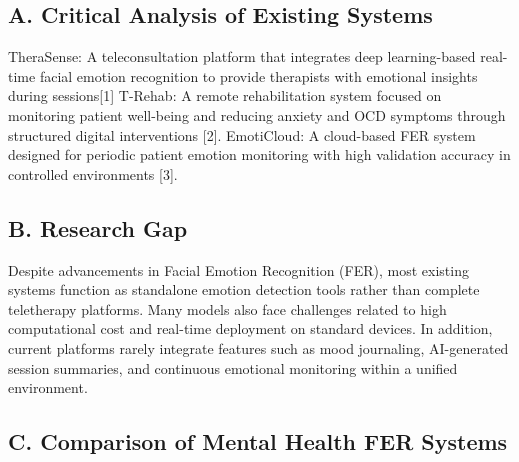 \documentclass[conference]{IEEEtran}
\begin{document}
\subsection{A. Critical Analysis of Existing Systems}
TheraSense: A teleconsultation platform that integrates deep learning-based real-time facial emotion recognition to provide therapists with emotional insights during sessions[1]
T-Rehab: A remote rehabilitation system focused on monitoring patient well-being and reducing anxiety and OCD symptoms through structured digital interventions [2].
EmotiCloud: A cloud-based FER system designed for periodic patient emotion monitoring with high validation accuracy in controlled environments [3].
\subsection{B. Research Gap}
Despite advancements in Facial Emotion Recognition (FER), most existing systems function as standalone emotion detection tools rather than complete teletherapy platforms. Many models also face challenges related to high computational cost and real-time deployment on standard devices. In addition, current platforms rarely integrate features such as mood journaling, AI-generated session summaries, and continuous emotional monitoring within a unified environment.
\subsection{C. Comparison of Mental Health FER Systems}
\begin{table}[t]
\caption{Comparison of Mental Health FER Systems}
\centering
\small
\setlength{\tabcolsep}{4pt}
\renewcommand{\arraystretch}{1.15}
\end{table}
\end{document}
